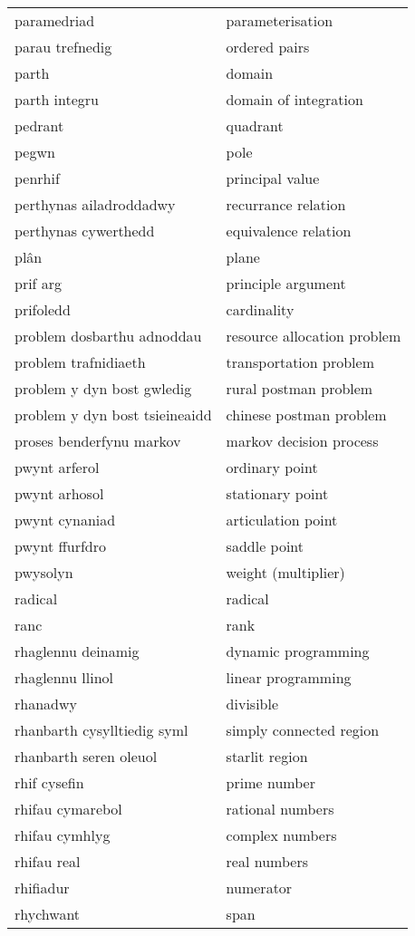 \begin{supertabular}{p{0.22\textwidth}p{0.22\textwidth}}
paramedriad & parameterisation \\
parau trefnedig & ordered pairs \\
parth & domain \\
parth integru & domain of integration \\
pedrant & quadrant \\
pegwn & pole \\
penrhif & principal value \\
perthynas ailadroddadwy & recurrance relation \\
perthynas cywerthedd & equivalence relation \\
plân & plane \\
prif arg & principle argument \\
prifoledd & cardinality \\
problem dosbarthu adnoddau & resource allocation problem \\
problem trafnidiaeth & transportation problem \\
problem y dyn bost gwledig & rural postman problem \\
problem y dyn bost tsieineaidd & chinese postman problem \\
proses benderfynu markov & markov decision process \\
pwynt arferol & ordinary point \\
pwynt arhosol & stationary point \\
pwynt cynaniad & articulation point \\
pwynt ffurfdro & saddle point \\
pwysolyn & weight (multiplier) \\
radical & radical \\
ranc & rank \\
rhaglennu deinamig & dynamic programming \\
rhaglennu llinol & linear programming \\
rhanadwy & divisible \\
rhanbarth cysylltiedig syml & simply connected region \\
rhanbarth seren oleuol & starlit region \\
rhif cysefin & prime number \\
rhifau cymarebol & rational numbers \\
rhifau cymhlyg & complex numbers \\
rhifau real & real numbers \\
rhifiadur & numerator \\
rhychwant & span \\

\end{supertabular}
